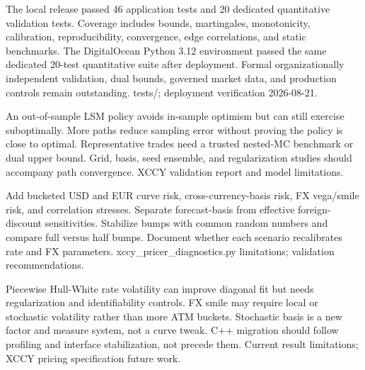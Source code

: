 {The local release passed 46 application tests and 20 dedicated quantitative validation tests.}
{Coverage includes bounds, martingales, monotonicity, calibration, reproducibility, convergence, edge correlations, and static benchmarks.}
{The DigitalOcean Python 3.12 environment passed the same dedicated 20-test quantitative suite after deployment.}
{Formal organizationally independent validation, dual bounds, governed market data, and production controls remain outstanding.}
{tests/; deployment verification 2026-08-21.}

{An out-of-sample LSM policy avoids in-sample optimism but can still exercise suboptimally.}
{More paths reduce sampling error without proving the policy is close to optimal.}
{Representative trades need a trusted nested-MC benchmark or dual upper bound.}
{Grid, basis, seed ensemble, and regularization studies should accompany path convergence.}
{XCCY validation report and model limitations.}

{Add bucketed USD and EUR curve risk, cross-currency-basis risk, FX vega/smile risk, and correlation stresses.}
{Separate forecast-basis from effective foreign-discount sensitivities.}
{Stabilize bumps with common random numbers and compare full versus half bumps.}
{Document whether each scenario recalibrates rate and FX parameters.}
{xccy\_pricer\_diagnostics.py limitations; validation recommendations.}

{Piecewise Hull-White rate volatility can improve diagonal fit but needs regularization and identifiability controls.}
{FX smile may require local or stochastic volatility rather than more ATM buckets.}
{Stochastic basis is a new factor and measure system, not a curve tweak.}
{C++ migration should follow profiling and interface stabilization, not precede them.}
{Current result limitations; XCCY pricing specification future work.}

